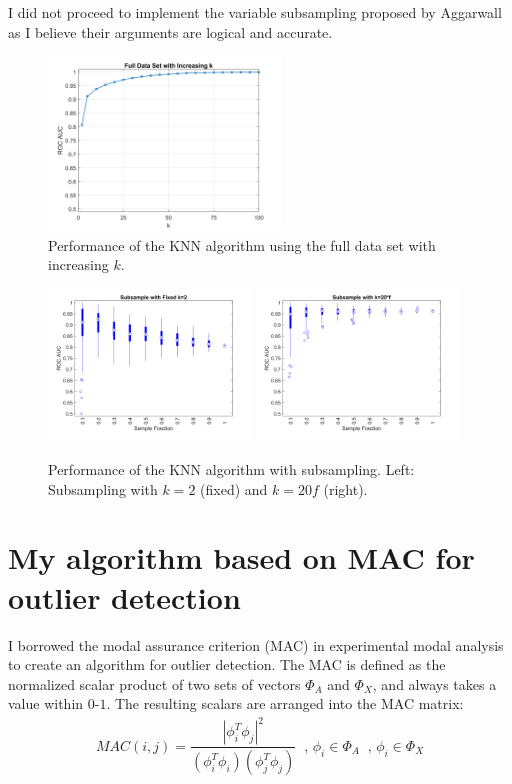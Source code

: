 \documentclass[12pt]{article}
\begin{document}
I did not proceed to implement the variable subsampling proposed by Aggarwall as I believe their arguments are logical and accurate.

\begin{figure}[ht!]
\centering
\includegraphics[width=0.55\textwidth]{fullDataSet_increasingK}
\caption{Performance of the KNN algorithm using the full data set with increasing $k$.}
\label{fig:fig5a}
\end{figure}

\begin{figure}[ht!]
\centering
\includegraphics[width=0.48\textwidth]{subsampleWithFixedK}
\includegraphics[width=0.48\textwidth]{subsampleWithProportionalK}
\caption{Performance of the KNN algorithm with subsampling. Left: Subsampling with $k=2$ (fixed) and $k=20f$ (right).}
\label{fig:fig6}
\end{figure}

\vspace{10ex}
\section{My algorithm based on MAC for outlier detection}
I borrowed the modal assurance criterion (MAC) in experimental modal analysis to create an algorithm
for outlier detection.
The MAC is defined as the normalized scalar product of two sets of vectors $\Phi_A$ and $\Phi_X$,
and always takes a value within $0\mbox{-}1$.
The resulting scalars are arranged into the MAC matrix:
\begin{gather*}
MAC(i,j) = \dfrac{|\phi_{i}^T\phi_{j}|^2}{\left(\phi_i^T\phi_i\right)\left(\phi_j^T\phi_j\right)}
\; \; , \,
\phi_i \in \Phi_A
\; \; , \,
\phi_i \in \Phi_X
\end{gather*}
\end{document}
